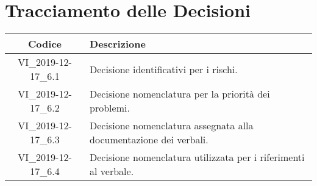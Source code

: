 \section*{Tracciamento delle Decisioni}

\begin{center}
	\begin{longtable}{|c|p{12.25cm}|}
	\hline
	\rowcolor{lighter-grayer}
	\textbf{Codice} & \textbf{Descrizione} \\
	\hline
	\endfirsthead
	
	\hline
	VI\_2019-12-17\_6.1 & Decisione identificativi per i rischi. \\
	\hline
	VI\_2019-12-17\_6.2 & Decisione nomenclatura per la priorità dei problemi. \\
	\hline
	VI\_2019-12-17\_6.3 & Decisione nomenclatura assegnata alla documentazione dei verbali. \\
	\hline
	VI\_2019-12-17\_6.4 & Decisione nomenclatura utilizzata per i riferimenti al verbale. \\
	\hline

	\end{longtable}
\end{center}